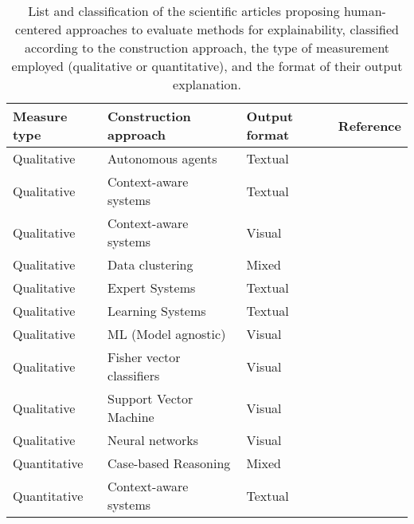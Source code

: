 \documentclass[final,1p,times]{elsarticle}
\begin{document}
\begin{table}[htbp]
\footnotesize
  \caption{List and classification of the scientific articles proposing human-centered approaches to evaluate methods for explainability, classified according to the construction approach, the type of measurement employed (qualitative or quantitative), and the format of their output explanation.}
  \label{tab:human-evaluation}
  \begin{tabular}{m{1.8cm} m{5cm} m{2cm} m{3cm}}
    \hline
    Measure type & Construction approach & Output format & Reference\\
    \hline
    Qualitative & Autonomous agents & Textual & \cite{dzindolet2003role}\\
    Qualitative & Context-aware systems & Textual & \cite{lim2009assessing, lim2009and}\\
    Qualitative & Context-aware systems & Visual & \cite{lim2009assessing}\\
    Qualitative & Data clustering & Mixed &  \cite{kim2015mind}\\
    Qualitative & Expert Systems & Textual & \cite{suermondt1993evaluation, ye1995impact}\\
    Qualitative & Learning Systems & Textual & \cite{putnam2019exploring}\\
    Qualitative & ML (Model agnostic) & Visual & \cite{krause2016interacting, tullio2007works}\\
    Qualitative & Fisher vector classifiers & Visual & \cite{lapuschkin2016analyzing}\\
    Qualitative & Support Vector Machine & Visual & \cite{srinivasan2017interpretable}\\
    Qualitative & Neural networks & Visual & \cite{assaf2019explainable, erhan2009visualizing, ding2017visualizing,sturm2016interpretable}\\
    Quantitative & Case-based Reasoning & Mixed & \cite{kim2014bayesian}\\
    Quantitative & Context-aware systems & Textual & \cite{lim2009and}\\

\end{tabular}
\end{table}
\end{document}
